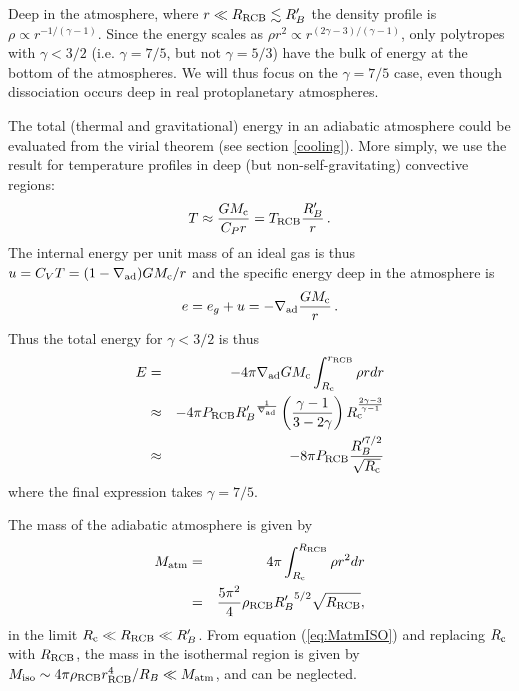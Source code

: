 \documentclass[apj]{emulateapj}
\newcommand{\delad}{\nabla_{\rm ad}}
\newcommand{\Rg}{\mathcal{R}}
\newcommand{\co}{_{\rm c}}
\newcommand{\di}{_{\rm d}}
\newcommand{\cb}{_{\rm RCB}}
\begin{document}
  Deep in the atmosphere, where $r \ll R\cb \lesssim R_B'$ the density profile is $\rho \propto r^{-1/(\gamma -1)}$.  Since the energy scales as $\rho r^2 \propto r^{(2\gamma -3)/(\gamma - 1)}$, only polytropes with $\gamma < 3/2$ (i.e. $\gamma = 7/5$, but not $\gamma = 5/3$) have the bulk of energy at the bottom of the atmospheres.  We will thus focus on the $\gamma = 7/5$ case, even though dissociation occurs deep in real protoplanetary atmospheres.

The total (thermal and gravitational) energy in an adiabatic atmosphere could be evaluated from the virial theorem (see section \ref{cooling}).  More simply, we use the result for temperature profiles in deep (but non-self-gravitating) convective regions:
\begin{equation}
T \approx {G M\co \over C_P r} = T\cb {R_B' \over r}\, .
\end{equation} 
The internal energy per unit mass of an ideal gas is thus $u = C_V T = (1 - \delad) G M\co/r$ and the specific energy  deep in the atmosphere is
\begin{equation}
e = e_g + u = -\delad {GM\co \over r} \, .
\end{equation} 
Thus the total energy for $\gamma < 3/2$ is thus
\begin{eqnarray} 
E &=& - 4 \pi \nabla_{\rm ad} G M\co \int_{R\co}^{r\cb} \rho r dr \\
&\approx& - 4 \pi P\cb {R_B'}^{1 \over \nabla_{\rm ad}} \left(\gamma-1 \over 3 - 2 \gamma\right)  R\co^{2\gamma-3\over \gamma-1}  \\
&\approx& - 8 \pi P\cb {R_B'^{7/2} \over \sqrt{R\co}}
\end{eqnarray} 
where the final expression takes $\gamma = 7/5$. %

The mass of the adiabatic atmosphere is given by
\begin{eqnarray} 
\label{eq:Matman}
M_{\rm atm} &=& 4 \pi \int_{R\co}^{R\cb} \rho r^2 dr \\
&=& {5 \pi^2 \over 4} \rho\cb {R_B'}^{5/2} \sqrt{R\cb}, %
\end{eqnarray}
in the limit $R\co \ll R\cb \ll R_B'$. From equation (\ref{eq:MatmISO}) and replacing $R_{\rm c}$ with $R\cb$, the mass in the isothermal region is given by $M_{\rm iso} \sim 4 \pi \rho\cb r\cb^4/R_B \ll M_{\rm atm}$, and can be neglected.
\end{document}

